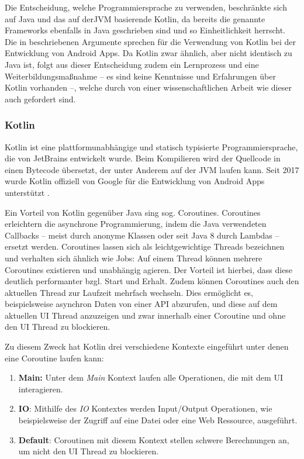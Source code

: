 			Die Entscheidung, welche Programmiersprache zu verwenden, beschränkte sich auf Java und das auf der\ac{JVM} basierende Kotlin, da bereits die genannte Frameworks ebenfalls in Java geschrieben sind und so Einheitlichkeit herrscht. Die in \cite{AnnieDossey.2019} beschriebenen Argumente sprechen für die Verwendung von Kotlin bei der Entwicklung von Android Apps. Da Kotlin zwar ähnlich, aber nicht identisch zu Java ist, folgt aus dieser Entscheidung zudem ein Lernprozess und eine Weiterbildungsmaßnahme -- es sind keine Kenntnisse und Erfahrungen über Kotlin vorhanden --, welche durch von einer wissenschaftlichen Arbeit wie dieser auch gefordert sind. 
		
			\subsubsection{Kotlin} %
			
				Kotlin ist eine plattformunabhängige und statisch typisierte Programmiersprache, die von JetBrains entwickelt wurde. Beim Kompilieren wird der Quellcode in einen Bytecode übersetzt, der unter Anderem auf der JVM laufen kann. Seit 2017 wurde Kotlin offiziell von Google für die Entwicklung von Android Apps unterstützt \cite{JetBrains.2017}. 
				
				Ein Vorteil von Kotlin gegenüber Java sing sog. Coroutines. Coroutines erleichtern die asynchrone Programmierung, indem die Java verwendeten Callbacks -- meist durch anonyme Klassen oder seit Java 8 durch Lambdas -- ersetzt werden. Coroutines lassen sich als leichtgewichtige Threads bezeichnen und verhalten sich ähnlich wie Jobs: Auf einem Thread können mehrere Coroutines existieren und unabhängig agieren. Der Vorteil ist hierbei, dass diese deutlich performanter bzgl. Start und Erhalt. Zudem können Coroutines auch den aktuellen Thread zur Laufzeit mehrfach wechseln. Dies ermöglicht es, beispielsweise asynchron Daten von einer API abzurufen, und diese auf dem aktuellen UI Thread anzuzeigen und zwar innerhalb einer Coroutine und ohne den UI Thread zu blockieren. 
				
				Zu diesem Zweck hat Kotlin drei verschiedene Kontexte eingeführt unter denen eine Coroutine laufen kann:
				
				\begin{enumerate}
					\item 
						\textbf{Main: }Unter dem \textit{Main} Kontext laufen alle Operationen, die mit dem \ac{UI} interagieren. 
					\item 
						\textbf{IO}: Mithilfe des \textit{\ac{IO}} Kontextes werden Input/Output Operationen, wie beispielsweise der Zugriff auf eine Datei oder eine Web Ressource, ausgeführt.
					\item 
						\textbf{Default}: Coroutinen mit diesem Kontext stellen schwere Berechnungen an, um nicht den \ac{UI} Thread zu blockieren. 
				\end{enumerate}
				
